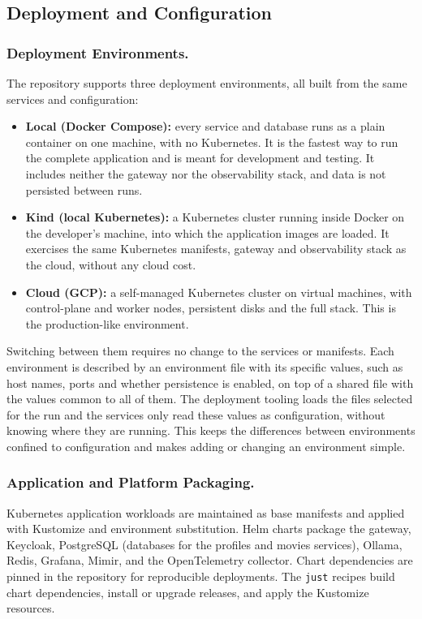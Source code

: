 \documentclass[10pt]{llncs}
\begin{document}
\subsection{Deployment and Configuration}

\subsubsection{Deployment Environments.}\label{sec:deployment}

The repository supports three deployment environments, all built from the same services and configuration:
\begin{itemize}
    \item \textbf{Local (Docker Compose):} every service and database runs as a plain container on one machine, with no Kubernetes. It is the fastest way to run the complete application and is meant for development and testing. It includes neither the gateway nor the observability stack, and data is not persisted between runs.
    \item \textbf{Kind (local Kubernetes):} a Kubernetes cluster running inside Docker on the developer's machine, into which the application images are loaded. It exercises the same Kubernetes manifests, gateway and observability stack as the cloud, without any cloud cost.
    \item \textbf{Cloud (GCP):} a self-managed Kubernetes cluster on virtual machines, with control-plane and worker nodes, persistent disks and the full stack. This is the production-like environment.
\end{itemize}
Switching between them requires no change to the services or manifests. Each environment is described by an environment file with its specific values, such as host names, ports and whether persistence is enabled, on top of a shared file with the values common to all of them. The deployment tooling loads the files selected for the run and the services only read these values as configuration, without knowing where they are running. This keeps the differences between environments confined to configuration and makes adding or changing an environment simple.

\subsubsection{Application and Platform Packaging.}

Kubernetes application workloads are maintained as base manifests and applied with Kustomize and environment substitution. Helm charts package the gateway, Keycloak, PostgreSQL (databases for the profiles and movies services), Ollama, Redis, Grafana, Mimir, and the OpenTelemetry collector. Chart dependencies are pinned in the repository for reproducible deployments. The \texttt{just} recipes build chart dependencies, install or upgrade releases, and apply the Kustomize resources.
\end{document}
